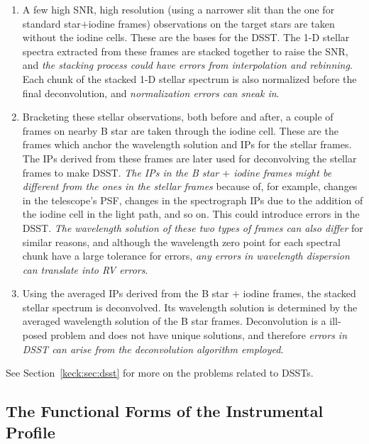 \begin{enumerate}
\item A few high SNR, high resolution (using a narrower slit than
  the one for standard star$+$iodine frames) observations on the target
  stars are taken without the iodine cells. These are the bases for the
  DSST. The 1-D stellar spectra extracted from these frames are stacked
  together to raise the SNR, and {\em the stacking process could have errors
    from interpolation and rebinning}. Each chunk of the stacked 1-D
  stellar spectrum is also normalized before the final deconvolution,
  and {\em normalization errors can sneak in}.
\item Bracketing these stellar observations, both before and after,
  a couple of frames on nearby B star are taken through the iodine
  cell. These are the frames which anchor the wavelength solution
  and IPs for the stellar frames. The IPs derived from these frames
  are later used for deconvolving the stellar frames to make
  DSST. {\em The IPs in the B star $+$ iodine frames might be different from the
    ones in the stellar frames} because of, for example, changes in the
  telescope's PSF, changes in the spectrograph IPs due to the
  addition of the iodine cell in the light path, and so on. This
  could introduce errors in the DSST. {\em The wavelength solution of
    these two types of frames can also differ} for similar reasons, and
  although the wavelength zero point for each spectral chunk have a
  large tolerance for errors, {\em any errors in wavelength dispersion
  can translate into RV errors}.
\item Using the averaged IPs derived from the B star $+$ iodine
  frames, the stacked stellar spectrum is deconvolved. Its
  wavelength solution is determined by the averaged wavelength
  solution of the B star frames. Deconvolution is a ill-posed
  problem and does not have unique solutions, and therefore {\em errors
    in DSST can arise from the deconvolution algorithm employed}. 
\end{enumerate}

See Section~\ref{keck:sec:dsst} for more on the problems related to DSSTs.




\subsection{The Functional Forms of the Instrumental Profile}\label{doppler:sec:ip}

